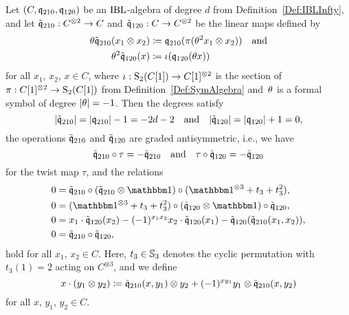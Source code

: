 \documentclass[\MainFolder/Text.tex]{subfiles}
\begin{document}
\begin{Proposition}\label{Prop:ClasModIBL}
Let $(C,\mathfrak{q}_{210}, \mathfrak{q}_{120})$ be an $\mathrm{IBL}$-algebra of degree $d$ from Definition~\ref{Def:IBLInfty}, and let $\tilde{\mathfrak{q}}_{210} : C^{\otimes 2} \rightarrow C$ and $\tilde{\mathfrak{q}}_{120}: C \rightarrow C^{\otimes 2}$ be the linear maps defined by
\begin{equation}\label{Eq:ClasModIBL}
\begin{aligned}
\theta \tilde{\mathfrak{q}}_{210}(x_1 \otimes x_2) &\coloneqq \mathfrak{q}_{210}(\pi(\theta^2 x_1 \otimes x_2)) \quad\text{and} \\
\theta^2 \tilde{\mathfrak{q}}_{120}(x) &\coloneqq \iota(\mathfrak{q}_{120}(\theta x))
\end{aligned}
\end{equation}
for all $x_1$, $x_2$, $x\in C$, where $\iota: \mathrm{S}_2(C[1]) \rightarrow C[1]^{\otimes 2}$ is the section of $\pi: C[1]^{\otimes 2} \rightarrow \mathrm{S}_2(C[1])$ from Definition~\ref{Def:SymAlgebra} and~$\theta$ is a formal symbol of degree $|\theta| = -1$. Then the degrees satisfy
$$ |\tilde{\mathfrak{q}}_{210}| = |\mathfrak{q}_{210}| - 1 = -2d - 2\quad\text{and}\quad|\tilde{\mathfrak{q}}_{120}| = |\mathfrak{q}_{120}| + 1 = 0, $$
the operations $\tilde{\mathfrak{q}}_{210}$ and $\tilde{\mathfrak{q}}_{120}$ are graded antisymmetric, i.e., we have
$$ \tilde{\mathfrak{q}}_{210} \circ\tau = - \tilde{\mathfrak{q}}_{210}\quad\text{and}\quad\tau \circ \tilde{\mathfrak{q}}_{120} = - \tilde{\mathfrak{q}}_{120} $$
for the twist map $\tau$, and the relations
\begin{equation*}
\begin{aligned}
0&=\tilde{\OPQ}_{210}\circ (\tilde{\OPQ}_{210}\otimes \Id)\circ (\Id^{\otimes 3}+ t_3 + t_3^2), \\
0&=(\Id^{\otimes 3}+t_3 + t_3^2)\circ (\tilde{\OPQ}_{120}\otimes\Id)\circ \tilde{\OPQ}_{120}, \\
0&= x_1 \cdot \tilde{\OPQ}_{120}(x_2) - (-1)^{ x_1 x_2} x_2 \cdot \tilde{\OPQ}_{120}(x_1) - \tilde{\OPQ}_{120}(\tilde{\OPQ}_{210}(x_1,x_2)), \\
0& = \tilde{\OPQ}_{210} \circ \tilde{\OPQ}_{120},
\end{aligned}
\end{equation*}
hold for all $x_1$, $x_2\in C$. Here, $t_3 \in \mathbb{S}_3$ denotes the cyclic permutation with $t_3(1) = 2$ acting on $C^{\otimes 3}$, and we define
$$ x\cdot (y_1 \otimes y_2) \coloneqq \tilde{\mathfrak{q}}_{210}(x,y_1)\otimes y_2 + (-1)^{ x y_1} y_1 \otimes \tilde{\mathfrak{q}}_{210}(x,y_2) $$
for all $x$, $y_1$, $y_2 \in C$.
\end{Proposition}
\end{document}
